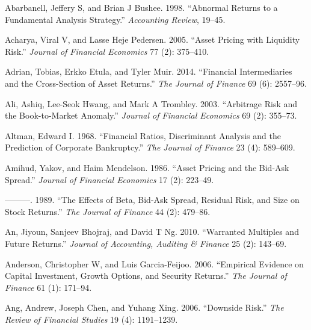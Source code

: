 \documentclass[
  letterpaper,
  DIV=11,
  numbers=noendperiod]{scrreprt}
\newlength{\cslhangindent}
\newlength{\cslentryspacingunit} %
\newenvironment{CSLReferences}[2] %
 {%
  \setlength{\parindent}{0pt}
  \ifodd #1
  \let\oldpar\par
  \def\par{\hangindent=\cslhangindent\oldpar}
  \fi
  \setlength{\parskip}{#2\cslentryspacingunit}
 }%
 {}
\begin{document}
\hypertarget{refs}{}
\begin{CSLReferences}{1}{0}
\leavevmode{}%
Abarbanell, Jeffery S, and Brian J Bushee. 1998. {``Abnormal Returns to
a Fundamental Analysis Strategy.''} \emph{Accounting Review}, 19--45.

\leavevmode{}%
Acharya, Viral V, and Lasse Heje Pedersen. 2005. {``Asset Pricing with
Liquidity Risk.''} \emph{Journal of Financial Economics} 77 (2):
375--410.

\leavevmode{}%
Adrian, Tobias, Erkko Etula, and Tyler Muir. 2014. {``Financial
Intermediaries and the Cross-Section of Asset Returns.''} \emph{The
Journal of Finance} 69 (6): 2557--96.

\leavevmode{}%
Ali, Ashiq, Lee-Seok Hwang, and Mark A Trombley. 2003. {``Arbitrage Risk
and the Book-to-Market Anomaly.''} \emph{Journal of Financial Economics}
69 (2): 355--73.

\leavevmode{}%
Altman, Edward I. 1968. {``Financial Ratios, Discriminant Analysis and
the Prediction of Corporate Bankruptcy.''} \emph{The Journal of Finance}
23 (4): 589--609.

\leavevmode{}%
Amihud, Yakov, and Haim Mendelson. 1986. {``Asset Pricing and the
Bid-Ask Spread.''} \emph{Journal of Financial Economics} 17 (2):
223--49.

\leavevmode{}%
---------. 1989. {``The Effects of Beta, Bid-Ask Spread, Residual Risk,
and Size on Stock Returns.''} \emph{The Journal of Finance} 44 (2):
479--86.

\leavevmode{}%
An, Jiyoun, Sanjeev Bhojraj, and David T Ng. 2010. {``Warranted
Multiples and Future Returns.''} \emph{Journal of Accounting, Auditing
\& Finance} 25 (2): 143--69.

\leavevmode{}%
Anderson, Christopher W, and Luis Garcia-Feijoo. 2006. {``Empirical
Evidence on Capital Investment, Growth Options, and Security Returns.''}
\emph{The Journal of Finance} 61 (1): 171--94.

\leavevmode{}%
Ang, Andrew, Joseph Chen, and Yuhang Xing. 2006. {``Downside Risk.''}
\emph{The Review of Financial Studies} 19 (4): 1191--1239.


\end{CSLReferences}
\end{document}
